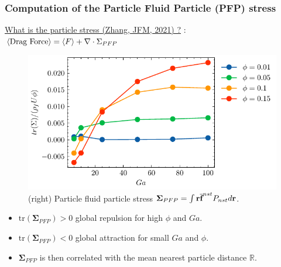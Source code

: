\documentclass{sintefbeamer}
\begin{document}
\begin{frame}
  \frametitle{Computation of the Particle Fluid Particle (PFP) stress}
  \underline{What is the particle stress (Zhang, JFM, 2021) ?}  
   : $\left<\text{Drag Force}\right> = \left<F\right> + \mathbf{\nabla}\cdot \Sigma_{PFP}$
  \begin{figure}
    \includegraphics[height=0.23\textwidth]{image/HOMOGENEOUS/fPA/PFP.pdf}
    \caption{ 
      (right) Particle fluid particle stress $\bm{\Sigma}_{PFP} = \int \textbf{r}\overline{\textbf{f}}^{nst} P_{nst}d\textbf{r}$.
      }
  \end{figure}
  
\begin{itemize}
  \item $\text{tr}(\bm{\Sigma}_{PFP}) > 0$ global repulsion for high $\phi$ and $Ga$. 
  \item $\text{tr}(\bm{\Sigma}_{PFP}) < 0$ global attraction for small $Ga$ and $\phi$.
  \item  $\bm{\Sigma}_{PFP}$ is then correlated with the mean nearest particle distance $\mathbb{R}$. 
\end{itemize}

\end{frame}
\end{document}
